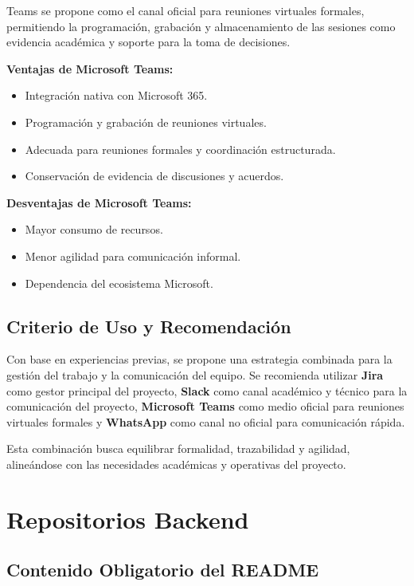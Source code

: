 \documentclass[12pt]{article}
\begin{document}
Teams se propone como el canal oficial para reuniones virtuales formales, permitiendo la programación, grabación y almacenamiento de las sesiones como evidencia académica y soporte para la toma de decisiones.

\textbf{Ventajas de Microsoft Teams:}
\begin{itemize}
    \item Integración nativa con Microsoft 365.
    \item Programación y grabación de reuniones virtuales.
    \item Adecuada para reuniones formales y coordinación estructurada.
    \item Conservación de evidencia de discusiones y acuerdos.
\end{itemize}

\textbf{Desventajas de Microsoft Teams:}
\begin{itemize}
    \item Mayor consumo de recursos.
    \item Menor agilidad para comunicación informal.
    \item Dependencia del ecosistema Microsoft.
\end{itemize}

\subsection{Criterio de Uso y Recomendación}

Con base en experiencias previas, se propone una estrategia combinada para la gestión del trabajo y la comunicación del equipo. Se recomienda utilizar \textbf{Jira} como gestor principal del proyecto, \textbf{Slack} como canal académico y técnico para la comunicación del proyecto, \textbf{Microsoft Teams} como medio oficial para reuniones virtuales formales y \textbf{WhatsApp} como canal no oficial para comunicación rápida.

Esta combinación busca equilibrar formalidad, trazabilidad y agilidad, alineándose con las necesidades académicas y operativas del proyecto.


\section{Repositorios Backend}

\subsection{Contenido Obligatorio del README}
\end{document}
